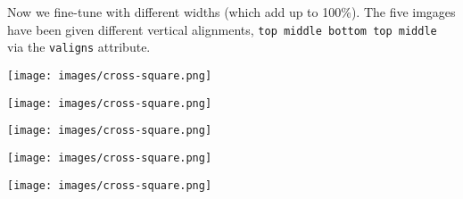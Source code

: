 \documentclass[10pt,]{article}
\theoremstyle{plain}
\theoremstyle{definition}
\theoremstyle{definition}
\theoremstyle{definition}
\theoremstyle{definition}
\theoremstyle{definition}
\theoremstyle{definition}
\numberwithin{equation}{section}
\newlength{\panelmax}
\begin{document}
\par
\hypertarget{p-655}{}%
Now we fine-tune with different widths (which add up to 100\%).  The five imgages have been given different vertical alignments, \lstinline?top middle bottom top middle? via the \lstinline?valigns? attribute.%
{%
\setlength{\panelmax}{0pt}
\ifdefined\panelboxAimage\else\newsavebox{\panelboxAimage}\fi%
\begin{lrbox}{\panelboxAimage}
\texttt{[image: images/cross-square.png]}
\end{lrbox}
\ifdefined\phAimage\else\newlength{\phAimage}\fi%
\setlength{\phAimage}{\ht\panelboxAimage+\dp\panelboxAimage}
\settototalheight{\phAimage}{\usebox{\panelboxAimage}}
\setlength{\panelmax}{\maxof{\panelmax}{\phAimage}}
\ifdefined\panelboxBimage\else\newsavebox{\panelboxBimage}\fi%
\begin{lrbox}{\panelboxBimage}
\texttt{[image: images/cross-square.png]}
\end{lrbox}
\ifdefined\phBimage\else\newlength{\phBimage}\fi%
\setlength{\phBimage}{\ht\panelboxBimage+\dp\panelboxBimage}
\settototalheight{\phBimage}{\usebox{\panelboxBimage}}
\setlength{\panelmax}{\maxof{\panelmax}{\phBimage}}
\ifdefined\panelboxCimage\else\newsavebox{\panelboxCimage}\fi%
\begin{lrbox}{\panelboxCimage}
\texttt{[image: images/cross-square.png]}
\end{lrbox}
\ifdefined\phCimage\else\newlength{\phCimage}\fi%
\setlength{\phCimage}{\ht\panelboxCimage+\dp\panelboxCimage}
\settototalheight{\phCimage}{\usebox{\panelboxCimage}}
\setlength{\panelmax}{\maxof{\panelmax}{\phCimage}}
\ifdefined\panelboxDimage\else\newsavebox{\panelboxDimage}\fi%
\begin{lrbox}{\panelboxDimage}
\texttt{[image: images/cross-square.png]}
\end{lrbox}
\ifdefined\phDimage\else\newlength{\phDimage}\fi%
\setlength{\phDimage}{\ht\panelboxDimage+\dp\panelboxDimage}
\settototalheight{\phDimage}{\usebox{\panelboxDimage}}
\setlength{\panelmax}{\maxof{\panelmax}{\phDimage}}
\ifdefined\panelboxEimage\else\newsavebox{\panelboxEimage}\fi%
\begin{lrbox}{\panelboxEimage}
\texttt{[image: images/cross-square.png]}
\end{lrbox}
\ifdefined\phEimage\else\newlength{\phEimage}\fi%
}
\end{document}
